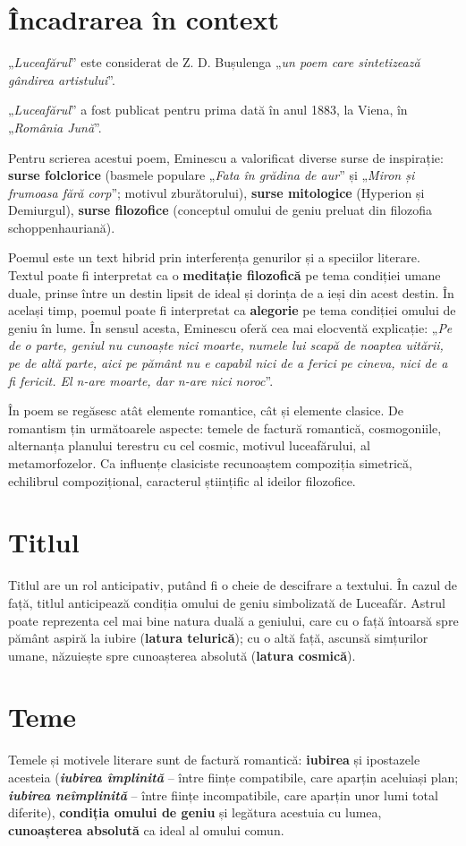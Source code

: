 \documentclass{article}
\newcommand{\qu}[1]{„\emph{#1}”}
\begin{document}
\section{Încadrarea în context}
\qu{Luceafărul} este considerat de Z. D. Bușulenga \qu{un poem care sintetizează gândirea artistului}.

\qu{Luceafărul} a fost publicat pentru prima dată în anul 1883, la Viena, în \qu{România Jună}.

Pentru scrierea acestui poem, Eminescu a valorificat diverse surse de inspirație: \textbf{surse folclorice} (basmele populare \qu{Fata în grădina de aur} și \qu{Miron și frumoasa fără corp}; motivul zburătorului), \textbf{surse mitologice} (Hyperion și Demiurgul), \textbf{surse filozofice} (conceptul omului de geniu preluat din filozofia schoppenhauriană).

Poemul este un text hibrid prin interferența genurilor și a speciilor literare. Textul poate fi interpretat ca o \textbf{meditație filozofică} pe tema condiției umane duale, prinse între un destin lipsit de ideal și dorința de a ieși din acest destin. În același timp, poemul poate fi interpretat ca \textbf{alegorie} pe tema condiției omului de geniu în lume. În sensul acesta, Eminescu oferă cea mai elocventă explicație: \qu{Pe de o parte, geniul nu cunoaște nici moarte, numele lui scapă de noaptea uitării, pe de altă parte, aici pe pământ nu e capabil nici de a ferici pe cineva, nici de a fi fericit. El n-are moarte, dar n-are nici noroc}.

În poem se regăsesc atât elemente romantice, cât și elemente clasice. De romantism țin următoarele aspecte: temele de factură romantică, cosmogoniile, alternanța planului terestru cu cel cosmic, motivul luceafărului, al metamorfozelor. Ca influențe clasiciste recunoaștem compoziția simetrică, echilibrul compozițional, caracterul științific al ideilor filozofice.
\section{Titlul}
Titlul are un rol anticipativ, putând fi o cheie de descifrare a textului. În cazul de față, titlul anticipează condiția omului de geniu simbolizată de Luceafăr. Astrul poate reprezenta cel mai bine natura duală a geniului, care cu o față întoarsă spre pământ aspiră la iubire (\textbf{latura telurică}); cu o altă față, ascunsă simțurilor umane, năzuiește spre cunoașterea absolută (\textbf{latura cosmică}).

\section{Teme}
Temele și motivele literare sunt de factură romantică: \textbf{iubirea} și ipostazele acesteia (\textsl{\textbf{iubirea împli\-nită}} -- între ființe compatibile, care aparțin aceluiași plan; \textsl{\textbf{iubirea neîmplinită}} -- între ființe incompatibile, care aparțin unor lumi total diferite), \textbf{condiția omului de geniu} și legătura acestuia cu lumea, \textbf{cunoașterea absolută} ca ideal al omului comun.
\end{document}
